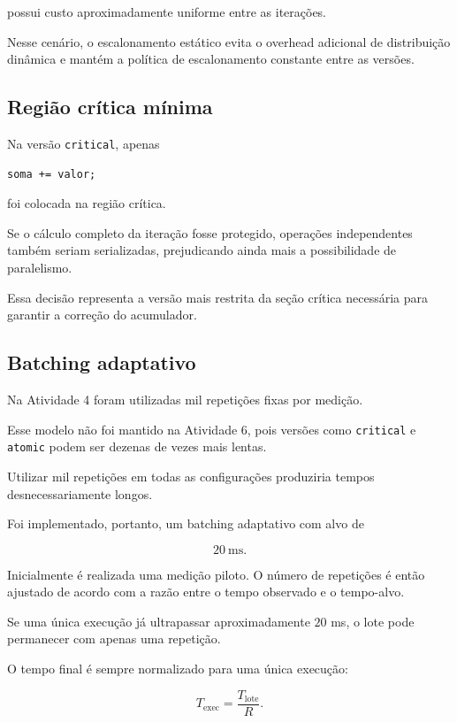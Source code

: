 possui custo aproximadamente uniforme entre as iterações.

Nesse cenário, o escalonamento estático evita o overhead adicional de
distribuição dinâmica e mantém a política de escalonamento constante entre
as versões.


\subsection{Região crítica mínima}

Na versão \texttt{critical}, apenas

\begin{verbatim}
soma += valor;
\end{verbatim}

foi colocada na região crítica.

Se o cálculo completo da iteração fosse protegido, operações independentes
também seriam serializadas, prejudicando ainda mais a possibilidade de
paralelismo.

Essa decisão representa a versão mais restrita da seção crítica necessária
para garantir a correção do acumulador.


\subsection{Batching adaptativo}

Na Atividade 4 foram utilizadas mil repetições fixas por medição.

Esse modelo não foi mantido na Atividade 6, pois versões como
\texttt{critical} e \texttt{atomic} podem ser dezenas de vezes mais lentas.

Utilizar mil repetições em todas as configurações produziria tempos
desnecessariamente longos.

Foi implementado, portanto, um batching adaptativo com alvo de

\begin{equation}
    20\ \text{ms}.
\end{equation}

Inicialmente é realizada uma medição piloto. O número de repetições é então
ajustado de acordo com a razão entre o tempo observado e o tempo-alvo.

Se uma única execução já ultrapassar aproximadamente \(20\) ms, o lote pode
permanecer com apenas uma repetição.

O tempo final é sempre normalizado para uma única execução:

\begin{equation}
    T_{\text{exec}}
    =
    \frac{T_{\text{lote}}}{R}.
\end{equation}


